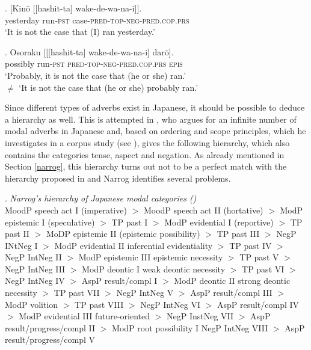 \exg. [Kinō [[hashit-ta] wake-de-wa-na-i]].\\
yesterday run-\textsc{pst} case-\textsc{pred-top-neg-pred.cop.prs}\\
`It is not the case that (I) ran yesterday.’ \label{wakekino}

\exg. Osoraku [[[hashit-ta] wake-de-wa-na-i] darō].\\
possibly run-\textsc{pst} \textsc{pred-top-neg-pred.cop.prs} \textsc{epis}\\
`Probably, it is not the case that (he or she) ran.’\\
$\neq$ `It is not the case that (he or she) probably ran.’ \\ \null \hfill \citep[556]{koizumi:2017:subject} \label{wakeosoraku}

Since different types of adverbs exist in Japanese, it should be possible to deduce a hierarchy as well. This is attempted in \citet{narrog:2009:mod}, who argues for an infinite number of modal adverbs in Japanese and, based on ordering and scope principles, which he investigates in a corpus study (see \citealt[71–76]{narrog:2009:mod}), gives the following hierarchy, which also contains the categories tense, aspect and negation. As already mentioned in Section \ref{narrog}, this hierarchy turns out not to be a perfect match with the hierarchy proposed in \citet{cinque:1999:adverbs} and Narrog identifies several problems.

\ex. \emph {Narrog's hierarchy of Japanese modal categories (\citealt[235]{narrog:2009:mod})}\\
MoodP speech act I (imperative) $>$ MoodP speech act II (hortative) $>$ ModP epistemic I (speculative) $>$ TP past I $>$ ModP evidential I (reportive) $>$ TP past II $>$ MoDP epistemic II (epistemic possibility) $>$ TP past III $>$ NegP INtNeg I $>$ ModP evidential II inferential evidentiality $>$ TP past IV $>$ NegP IntNeg II $>$ ModP epistemic III epistemic necessity $>$ TP past V $>$ NegP IntNeg III $>$ ModP deontic I weak deontic necessity $>$ TP past VI $>$ NegP IntNeg IV $>$ AspP result/compl I $>$ ModP deontic II strong deontic necessity $>$ TP past VII $>$ NegP IntNeg V $>$ AspP result/compl III $>$ ModP volition $>$ TP past VIII $>$ NegP IntNeg VI $>$ AspP result/compl IV $>$ ModP evidential III future-oriented $>$ NegP InstNeg VII $>$ AspP result/progress/compl II $>$ ModP root possibility I NegP IntNeg VIII $>$ AspP result/progress/compl V

